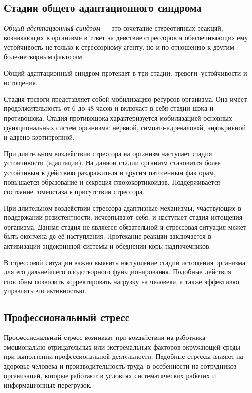 \subsection{Стадии общего адаптационного синдрома}

\textit{Общий адаптационный синдром} --- это сочетание стереотипных реакций, возникающих в организме в ответ на действие стрессоров и обеспечивающих ему устойчивость не только к стрессорному агенту, но и по отношению к другим болезнетворным факторам. \cite{stressAndPatology}

Общий адаптационный синдром протекает в три стадии: тревоги, устойчивости и истощения.

Стадия тревоги представляет собой мобилизацию ресурсов организма. Она имеет продолжительность от 6 до 48 часов и включает в себя стадии шока и противошока. Стадия противошока характеризуется мобилизацией основных функциональных систем организма: нервной, симпато-адреналовой, эндокринной и адрено-кортитропной. \cite{stressAndPatology}

При длительном воздействии стрессора на организм наступает стадия устойчивости (адаптации). На данной стадии организм становится более устойчивым к действию раздражителя и другим патогенным факторам, повышается образование и секреция глюкокортикоидов. Поддерживается состояние гомеостаза в присутствии стрессора. \cite{stressAndPatology}

При длительном воздействии стрессора адаптивные механизмы, участвующие в поддержании резистентности, исчерпывают себя, и наступает стадия истощения организма. Данная стадия не является обязательной и стрессовая ситуация может быть окончена до её наступления. Протекание реакции заключается в активизации эндокринной системы и обеднении коры надпочечников. \cite{stressAndPatology}

В стрессовой ситуации важно выявить наступление стадии истощения организма для его дальнейшего плодотворного функционирования. Подобные действия способны позволить корректировать нагрузку на человека, а также эффективно управлять его активностью.

\subsection{Профессиональный стресс}
Профессиональный стресс возникает при воздействии на работника эмоционально-отрицательных или экстремальных факторов окружающей среды при выполнении профессиональной деятельности. Подобные стрессы влияют на здоровье человека и производительность труда, в особенности на сотрудников организаций, которые работают в условиях систематических рабочих и информационных перегрузок. \cite{professionalStress}

